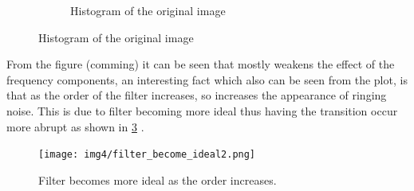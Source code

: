 \begin{figure}[H]
\begin{subfigure}[b]{0.16\textwidth}
        \caption{Histogram of the original image}
        \label{fig:img2_hist}
    \end{subfigure}
\end{figure}


From the figure (comming) it can be seen that mostly weakens the effect of the frequency components, an interesting fact which also can be seen from the plot, is that as the order of the filter increases,  so increases the appearance of ringing noise. This is due to  filter becoming more ideal thus having the transition occur more abrupt as shown in \ref{fig:filter_become_ideal}  . 

\begin{figure}[H]
	\centering
	\texttt{[image: img4/filter\_become\_ideal2.png]}
	\caption{Filter becomes more ideal as the order increases.}
    \label{fig:filter_become_ideal}
\end{figure}






